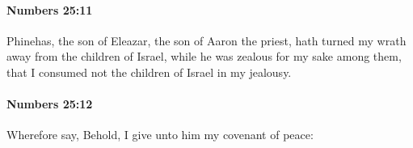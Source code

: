 		\paragraph{Numbers 25:11} %
			\label{NUMBERS-25-11}

			Phinehas, the son of Eleazar, the son of Aaron the priest, hath turned my wrath away from the children of Israel, while he was zealous for my sake among them, that I consumed not the children of Israel in my jealousy.


		\paragraph{Numbers 25:12} %
			\label{NUMBERS-25-12}

			Wherefore say, Behold, I give unto him my covenant of peace:


